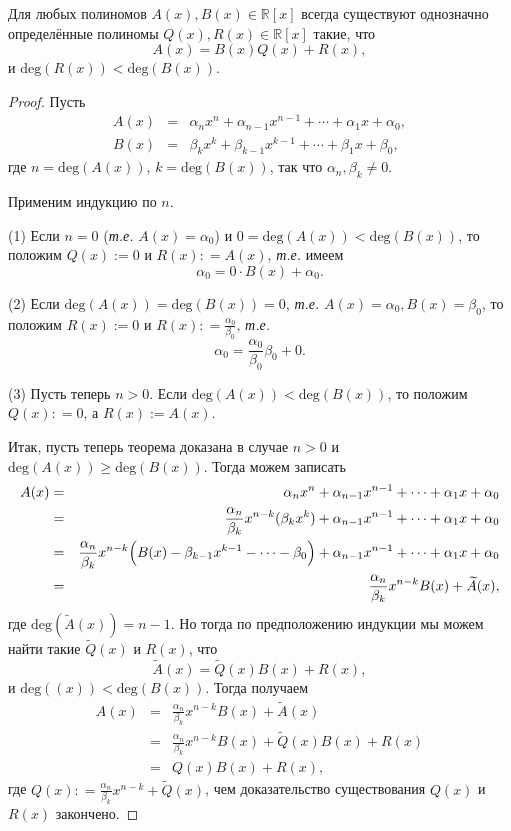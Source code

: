 \begin{theorem}\label{div_of_polynmials}
 Для любых полиномов $A(x), B(x) \in \mathbb{R}[x]$ всегда существуют однозначно определённые полиномы $Q(x), R(x) \in \mathbb{R}[x]$ такие, что
 \[
  A(x) = B(x) Q(x) + R(x),
 \]
 и $\mathrm{deg}(R(x)) < \mathrm{deg}(B(x)).$
\end{theorem}
\begin{proof}
    Пусть
    \begin{eqnarray*}
        A(x) &=& \alpha_nx^n + \alpha_{n-1}x^{n-1} + \cdots + \alpha_1x + \alpha_0, \\
        B(x) &=& \beta_kx^k + \beta_{k-1}x^{k-1} + \cdots + \beta_1x + \beta_0,
    \end{eqnarray*}
где $n = \mathrm{deg}(A(x))$, $k = \mathrm{deg}(B(x))$, так что $\alpha_n, \beta_k \ne 0$.

Применим индукцию по $n$.

(1) Если $n =0$ (\textit{т.е.} $A(x) = \alpha_0$) и $0=\mathrm{deg}(A(x)) < \mathrm{deg}(B(x))$, то положим $Q(x):=0$ и $R(x) : = A(x)$, \textit{т.е.} имеем
\[
 \alpha_0 = 0 \cdot B(x) + \alpha_0.
\]

(2) Если $\mathrm{deg}(A(x)) = \mathrm{deg}(B(x)) = 0$, \textit{т.е.} $A(x) = \alpha_0, B(x) = \beta_0$, то положим $R(x) :=0$ и $R(x): = \frac{\alpha_0}{\beta_0}$, \textit{т.е.}
\[
 \alpha_0 = \frac{\alpha_0}{\beta_0} \beta_0 +0.
\]

(3) Пусть теперь $n>0$. Если $\mathrm{deg}(A(x)) < \mathrm{deg}(B(x))$, то положим $Q(x) : = 0$, а $R(x):=A(x).$

Итак, пусть теперь теорема доказана в случае $n>0$ и $\mathrm{deg}(A(x)) \ge \mathrm{deg}(B(x))$. Тогда можем записать
\begin{eqnarray*}
    A(x) &=& \alpha_nx^n + \alpha_{n-1}x^{n-1} + \cdots + \alpha_1x + \alpha_0 \\
    &=& \frac{\alpha_n}{\beta_k} x^{n-k} (\beta_k x^k) + \alpha_{n-1}x^{n-1} + \cdots + \alpha_1x + \alpha_0 \\
    &=& \frac{\alpha_n}{\beta_k} x^{n-k} \Bigl( B(x) - \beta_{k-1}x^{k-1} - \cdots - \beta_0  \Bigr) + \alpha_{n-1}x^{n-1} + \cdots + \alpha_1x + \alpha_0 \\
    &=&  \frac{\alpha_n}{\beta_k}x^{n-k} B(x) + \widetilde{A}(x),
\end{eqnarray*}
где $\mathrm{deg}(\widetilde{A}(x)) = n-1.$ Но тогда по предположению индукции мы можем найти такие $\widetilde{Q}(x)$ и ${R}(x)$, что
\[
 \widetilde{A}(x) = \widetilde{Q}(x)B(x) + {R}(x),
\]
и $\mathrm{deg}((x))< \mathrm{deg}(B(x))$. Тогда получаем
\begin{eqnarray*}
    A(x) &=& \frac{\alpha_n}{\beta_k}x^{n-k} B(x) + \widetilde{A}(x) \\
    &=& \frac{\alpha_n}{\beta_k}x^{n-k} B(x) + \widetilde{Q}(x)B(x) + {R}(x)\\
    &=& Q(x) B(x) + R(x),
\end{eqnarray*}
где $Q(x): = \frac{\alpha_n}{\beta_k}x^{n-k} + \widetilde{Q}(x)$, чем доказательство существования $Q(x)$ и $R(x)$ закончено.


\end{proof}
